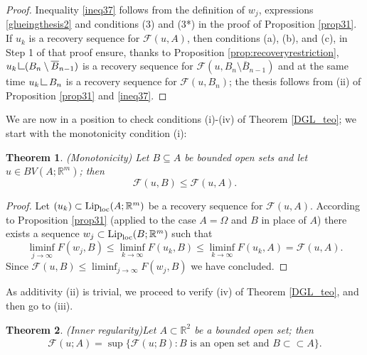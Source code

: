 \documentclass[a4paper,11pt]{article}
\numberwithin{equation}{section}
\newtheorem{theorem}{Theorem}[section]
\newcommand{\Om}{\Omega}
\newcommand{\R}{\mathbb{R}}
\newcommand{\res}      {\mathop{\hbox{\vrule height 7pt width .5pt depth
                        0pt\vrule height .5pt width 6pt depth 0pt}}\nolimits}
\begin{document}
\begin{proof}
Inequality \eqref{ineq37} follows from the definition of $w_j$, expressions \eqref{glueingthesis2} and conditions (3) and (3*) in the proof of Proposition  \ref{prop31}. If $u_k$ is a recovery sequence for  $\mathcal F(u,A)$, then conditions (a), (b), and (c), in Step 1 of that proof ensure, thanks to Proposition \ref{prop:recoveryrestriction}, $u_k\res (B_n\setminus \overline B_{n-1})$ is a recovery sequence for $ \mathcal F(u,B_n\setminus \overline B_{n-1})$ and at the same time $u_k\res B_n$ is a recovery sequence for $\mathcal F(u,B_n)$; the thesis follows from (ii) of Proposition \ref{prop31} and \eqref{ineq37}.
\end{proof}

We are now in a position to check conditions (i)-(iv) of Theorem \ref{DGL_teo};  we start with the monotonicity condition (i):

\begin{theorem}(Monotonicity)
Let $B\subseteq A$ be bounded open sets  and let $u\in BV(A;\R^m)$; then
$$\mathcal F(u,B)\leq \mathcal F(u,A).$$ 
\end{theorem}
\begin{proof}
Let $(u_k)\subset\text{{\rm Lip}}_{\text{{\rm loc}}}(A;\R^m)$ be a recovery sequence for $\mathcal F(u,A)$. According to Proposition \ref{prop31} (applied to the case $A=\Om$ and $B$ in place of $A$) there exists a sequence $w_j \subset\text{{\rm Lip}}_{\text{{\rm loc}}}(B;\R^m)$ such that 
$$\liminf_{j\rightarrow \infty}F(w_j,B)\leq \liminf_{k\rightarrow \infty}F(u_k,B)\leq \liminf_{k\rightarrow \infty}F(u_k,A)=\mathcal F(u,A).$$
Since $\mathcal F(u,B)\leq \liminf_{j\rightarrow \infty}F(w_j,B)$ we have concluded.
\end{proof}


As additivity (ii) is trivial, we proceed to verify (iv) of Theorem \ref{DGL_teo}, and then go to (iii). 


\begin{theorem}(Inner regularity)\label{thm_ir}
Let $A\subset\R^2$ be a bounded  open set; then 
\begin{align}
\mathcal F(u;A)=\sup\{\mathcal F(u;B):B\text{ is an open set and }B\subset\subset A\}.
\end{align}
\end{theorem}
\end{document}

